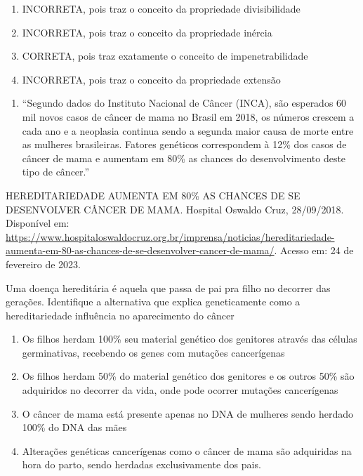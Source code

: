 \begin{enumerate}
\def\labelenumi{(\Alph{enumi})}
\item
  INCORRETA, pois traz o conceito da propriedade divisibilidade
\item
  INCORRETA, pois traz o conceito da propriedade inércia
\item
  CORRETA, pois traz exatamente o conceito de impenetrabilidade
\item
  INCORRETA, pois traz o conceito da propriedade extensão
\end{enumerate}

\begin{enumerate}
\def\labelenumi{\arabic{enumi})}
\item
  ``Segundo dados do Instituto Nacional de Câncer (INCA), são esperados
  60 mil novos casos de câncer de mama no Brasil em 2018, os números
  crescem a cada ano e a neoplasia continua sendo a segunda maior causa
  de morte entre as mulheres brasileiras. Fatores genéticos correspondem
  à 12\% dos casos de câncer de mama e aumentam em 80\% as chances do
  desenvolvimento deste tipo de câncer.''
\end{enumerate}

HEREDITARIEDADE AUMENTA EM 80\% AS CHANCES DE SE DESENVOLVER CÂNCER DE
MAMA. Hospital Oswaldo Cruz, 28/09/2018. Disponível em:
\url{https://www.hospitaloswaldocruz.org.br/imprensa/noticias/hereditariedade-aumenta-em-80-as-chances-de-se-desenvolver-cancer-de-mama/}.
Acesso em: 24 de fevereiro de 2023.

Uma doença hereditária é aquela que passa de pai pra filho no decorrer
das gerações. Identifique a alternativa que explica geneticamente como a
hereditariedade influência no aparecimento do câncer

\begin{enumerate}
\def\labelenumi{(\Alph{enumi})}
\item
  Os filhos herdam 100\% seu material genético dos genitores através das
  células germinativas, recebendo os genes com mutações cancerígenas
\item
  Os filhos herdam 50\% do material genético dos genitores e os outros
  50\% são adquiridos no decorrer da vida, onde pode ocorrer mutações
  cancerígenas
\item
  O câncer de mama está presente apenas no DNA de mulheres sendo herdado
  100\% do DNA das mães
\item
  Alterações genéticas cancerígenas como o câncer de mama são adquiridas
  na hora do parto, sendo herdadas exclusivamente dos pais.
\end{enumerate}

